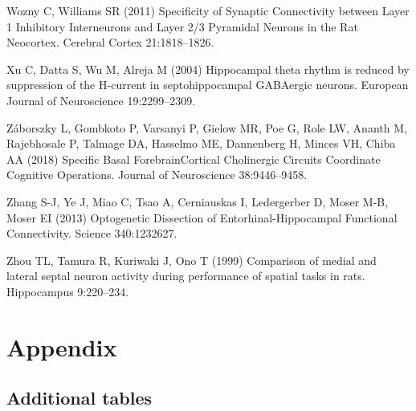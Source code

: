 \documentclass[
  12pt,
  a4paper,
  openany]{book}
\newlength{\cslhangindent}
\newlength{\cslentryspacingunit} %
\newenvironment{CSLReferences}[2] %
 {%
  \setlength{\parindent}{0pt}
  \ifodd #1
  \let\oldpar\par
  \def\par{\hangindent=\cslhangindent\oldpar}
  \fi
  \setlength{\parskip}{#2\cslentryspacingunit}
 }%
 {}
\begin{document}
\begin{CSLReferences}{1}{0}
\leavevmode{}%
Wozny C, Williams SR (2011) Specificity of {Synaptic} {Connectivity} between {Layer} 1 {Inhibitory} {Interneurons} and {Layer} 2/3 {Pyramidal} {Neurons} in the {Rat} {Neocortex}. Cerebral Cortex 21:1818--1826.

\leavevmode{}%
Xu C, Datta S, Wu M, Alreja M (2004) Hippocampal theta rhythm is reduced by suppression of the {H}-current in septohippocampal {GABAergic} neurons. European Journal of Neuroscience 19:2299--2309.

\leavevmode{}%
Záborszky L, Gombkoto P, Varsanyi P, Gielow MR, Poe G, Role LW, Ananth M, Rajebhosale P, Talmage DA, Hasselmo ME, Dannenberg H, Minces VH, Chiba AA (2018) Specific {Basal} {Forebrain}{\textendash}{Cortical} {Cholinergic} {Circuits} {Coordinate} {Cognitive} {Operations}. Journal of Neuroscience 38:9446--9458.

\leavevmode{}%
Zhang S-J, Ye J, Miao C, Tsao A, Cerniauskas I, Ledergerber D, Moser M-B, Moser EI (2013) Optogenetic {Dissection} of {Entorhinal}-{Hippocampal} {Functional} {Connectivity}. Science 340:1232627.

\leavevmode{}%
Zhou TL, Tamura R, Kuriwaki J, Ono T (1999) Comparison of medial and lateral septal neuron activity during performance of spatial tasks in rats. Hippocampus 9:220--234.

\end{CSLReferences}

\endgroup

\backmatter

\hypertarget{appendix}{%
\chapter*{Appendix}\label{appendix}}

\hypertarget{additional-tables}{%
\section*{Additional tables}\label{additional-tables}}

\begingroup\fontsize{8}{10}\selectfont
\end{document}
